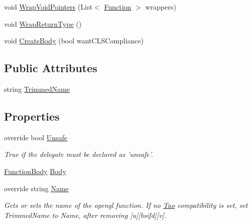 \begin{DoxyCompactItemize}
void \hyperlink{class_bind_1_1_structures_1_1_function_ace5586be3427b12fc108a6dcc28345a7}{WrapVoidPointers} (List$<$ \hyperlink{class_bind_1_1_structures_1_1_function}{Function} $>$ wrappers)
\item 
void \hyperlink{class_bind_1_1_structures_1_1_function_a216a433bdeca43d81be6a3640dc51e2c}{WrapReturnType} ()
\item 
void \hyperlink{class_bind_1_1_structures_1_1_function_a3f4345c12585e87265cca650db32f8fc}{CreateBody} (bool wantCLSCompliance)
\end{DoxyCompactItemize}
\subsection*{Public Attributes}
\begin{DoxyCompactItemize}
\item 
string \hyperlink{class_bind_1_1_structures_1_1_function_a4554b6c2d740cff2eb0f7e6fa2dac9d1}{TrimmedName}
\end{DoxyCompactItemize}
\subsection*{Properties}
\begin{DoxyCompactItemize}
\item 
override bool \hyperlink{class_bind_1_1_structures_1_1_function_a2f66fa19d8fa8035272d2e9cdd4f6b15}{Unsafe}
\begin{DoxyCompactList}\small\item\em True if the delegate must be declared as 'unsafe'. \item\end{DoxyCompactList}\item 
\hyperlink{class_bind_1_1_structures_1_1_function_body}{FunctionBody} \hyperlink{class_bind_1_1_structures_1_1_function_a3f1c0b31afb0138c5dec9335875b07e3}{Body}
\item 
override string \hyperlink{class_bind_1_1_structures_1_1_function_a99ff266fee9cde8a0dfe69d0e0e33bc6}{Name}
\begin{DoxyCompactList}\small\item\em Gets or sets the name of the opengl function. If no \hyperlink{namespace_tao}{Tao} compatibility is set, set TrimmedName to Name, after removing \mbox{[}u\mbox{]}\mbox{[}bsifd\mbox{]}\mbox{[}v\mbox{]}. \item\end{DoxyCompactList}\end{DoxyCompactItemize}


